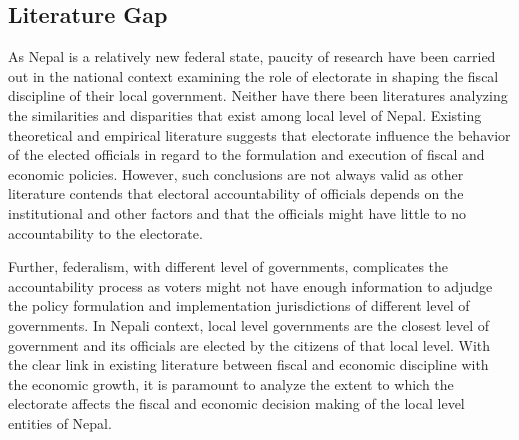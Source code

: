  \subsection{Literature Gap}
 As Nepal is a relatively new federal state, paucity of research have been carried out in the national context examining the role of electorate in shaping the fiscal discipline of their local government. Neither have there been literatures analyzing the similarities and disparities that exist among local level of Nepal. Existing theoretical and empirical literature suggests that electorate influence the behavior of the elected officials in regard to the formulation and execution of fiscal and economic policies. However, such conclusions are not always valid as other literature contends that electoral accountability of officials depends on the institutional and other factors and that the officials might have little to no accountability to the electorate.\par
 Further, federalism, with different level of governments, complicates the accountability process as voters might not have enough information to adjudge the policy formulation and implementation jurisdictions of different level of governments. In Nepali context, local level governments are the closest level of government and its officials are elected by the citizens of that local level. With the clear link in existing literature between fiscal and economic discipline with the economic growth, it is paramount to analyze the extent to which the electorate affects the fiscal and economic decision making of the local level entities of Nepal.